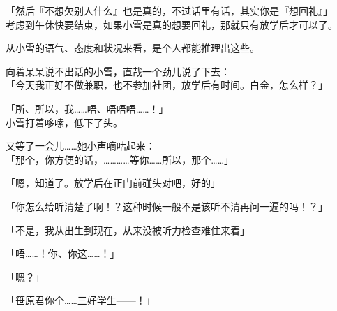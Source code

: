 「然后『不想欠别人什么』也是真的，不过话里有话，其实你是『想回礼』」\\

考虑到午休快要结束，如果小雪是真的想要回礼，那就只有放学后才可以了。

从小雪的语气、态度和状况来看，是个人都能推理出这些。

向着呆呆说不出话的小雪，直哉一个劲儿说了下去：\\

「今天我正好不做兼职，也不参加社团，放学后有时间。白金，怎么样？」

「所、所以，我……唔、唔唔唔……！」\\

小雪打着哆嗦，低下了头。

又等了一会儿……她小声嘀咕起来：\\

「那个，你方便的话，…………等你……所以，那个……」

「嗯，知道了。放学后在正门前碰头对吧，好的」

「你怎么给听清楚了啊！？这种时候一般不是该听不清再问一遍的吗！？」

「不是，我从出生到现在，从来没被听力检查难住来着」

「唔……！你、你这……！」

「嗯？」

「笹原君你个……三好学生——！」\\

